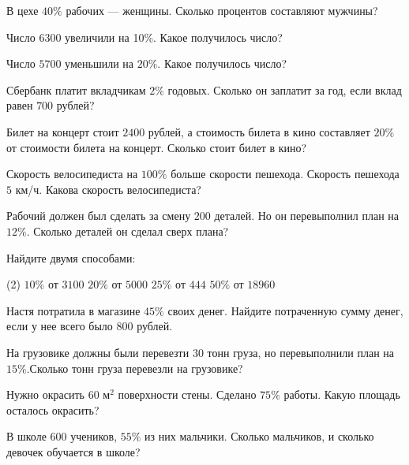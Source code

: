 \begin{class}[number=2]
	\begin{listofex}
		\item В цехе \( 40\% \) рабочих --- женщины. Сколько процентов составляют мужчины?
		\item Число \( 6300 \) увеличили на 10\%. Какое получилось число?
		\item Число \( 5700 \) уменьшили на \( 20\% \). Какое получилось число?
		\item Сбербанк платит вкладчикам \( 2\% \) годовых. Сколько он заплатит за год, если вклад равен \( 700 \) рублей?
		\item Билет на концерт стоит \( 2400 \) рублей, а стоимость билета в кино составляет \( 20\% \) от стоимости билета на концерт. Сколько стоит билет в кино?
		\item Скорость велосипедиста на \( 100\% \) больше скорости пешехода. Скорость пешехода \( 5 \) км/ч. Какова скорость велосипедиста?
		\item Рабочий должен был сделать за смену \( 200 \) деталей. Но он перевыполнил план на \( 12\% \). Сколько деталей он сделал сверх плана?
		\item {}
	\end{listofex}
\end{class}

\begin{homework}[number=1]
	\begin{listofex}
		\item Найдите двумя способами:
		\begin{tasks}(2)
			\task \( 10\% \) от \( 3100 \)
			\task \( 20\% \) от \( 5000 \)
			\task \( 25\% \) от \( 444 \)
			\task \( 50\% \) от \( 18960 \)
		\end{tasks}
		\item Настя потратила в магазине \( 45\% \) своих денег. Найдите потраченную сумму денег, если у нее всего было \( 800  \) рублей.
		\item На грузовике должны были перевезти \( 30 \) тонн груза, но перевыполнили план на \( 15\% \).Сколько тонн груза перевезли на грузовике?
		\item Нужно окрасить \( 60 \) м\( ^2 \) поверхности стены. Сделано \( 75\% \) работы. Какую площадь осталось окрасить?
		\item В школе \( 600 \) учеников, \( 55\% \) из них мальчики. Сколько мальчиков, и сколько девочек обучается в школе?
		\item \exercise{4107}
	\end{listofex}
\end{homework}

